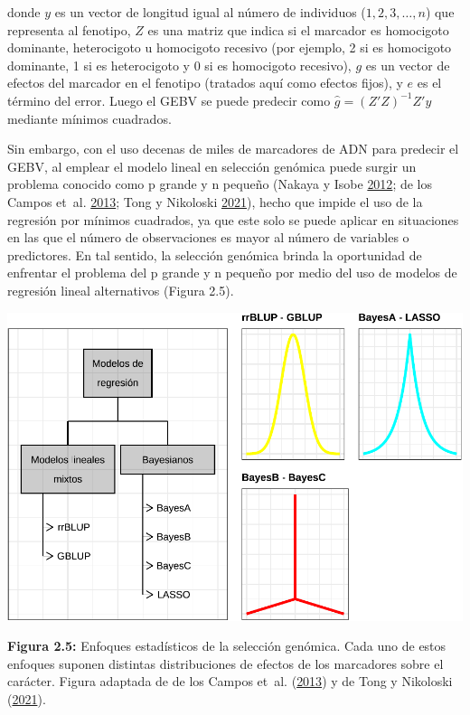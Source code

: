\documentclass[11pt,spanish,a4paper,oneside,]{book} %
\begin{document}
donde \(y\) es un vector de longitud igual al número de individuos (\(1, 2, 3, …, n\)) que representa al fenotipo, \(Z\) es una matriz que indica si el marcador es homocigoto dominante, heterocigoto u homocigoto recesivo (por ejemplo, 2 si es homocigoto dominante, 1 si es heterocigoto y 0 si es homocigoto recesivo), \(g\) es un vector de efectos del marcador en el fenotipo (tratados aquí como efectos fijos), y \(e\) es el término del error. Luego el GEBV se puede predecir como \(\hat{g} = (Z'Z)^{- 1} Z'y\) mediante mínimos cuadrados.

Sin embargo, con el uso decenas de miles de marcadores de ADN para predecir el GEBV, al emplear el modelo lineal en selección genómica puede surgir un problema conocido como p grande y n pequeño (Nakaya y Isobe \protect\hyperlink{ref-cite:6}{2012}; de los Campos et~al. \protect\hyperlink{ref-cite:31}{2013}; Tong y Nikoloski \protect\hyperlink{ref-cite:7}{2021}), hecho que impide el uso de la regresión por mínimos cuadrados, ya que este solo se puede aplicar en situaciones en las que el número de observaciones es mayor al número de variables o predictores. En tal sentido, la selección genómica brinda la oportunidad de enfrentar el problema del p grande y n pequeño por medio del uso de modelos de regresión lineal alternativos (Figura 2.5).

\begin{center}\includegraphics[width=1\linewidth]{figures/Mod_GS} \end{center}

\textbf{Figura 2.5:} Enfoques estadísticos de la selección genómica. Cada uno de estos enfoques suponen distintas distribuciones de efectos de los marcadores sobre el carácter. Figura adaptada de de los Campos et~al. (\protect\hyperlink{ref-cite:31}{2013}) y de Tong y Nikoloski (\protect\hyperlink{ref-cite:7}{2021}).
\end{document}
